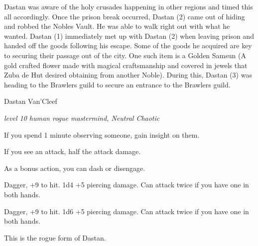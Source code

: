 Dastan was aware of the holy crusades happening in other regions and timed this all accordingly. Once the prison break occurred, Dastan (2) came out of hiding and robbed the Nobles Vault. He was able to walk right out with what he wanted. Dastan (1) immediately met up with Dastan (2) when leaving prison and handed off the goods following his escape. Some of the goods he acquired are key to securing their passage out of the city. One such item is a Golden Samsun (A gold crafted flower made with magical craftsmanship and covered in jewels that Zuba de Hut desired obtaining from another Noble). During this, Dastan (3) was heading to the Brawlers guild to secure an entrance to the Brawlers guild.

\begin{monsterbox}{Dastan Van'Cleef}
	\begin{hangingpar}
		\textit{level 10 human rogue mastermind, Neutral Chaotic}
	\end{hangingpar}
	\dndline%
	\basics[%
	armorclass = 18,
	hitpoints  = 81,
	speed      = 30 ft
	]
	\dndline%
	\stats[
	STR = \stat{8}, %
	DEX = \stat{20},
	CON = \stat{16},
	INT = \stat{12},
	WIS = \stat{11},
	CHA = \stat{17}
	]
	\dndline%
	\details[%
	languages = {Common, Elvish, Dwarvish, Gnomish, Halfling, Celestial, Draconic, Primordial},
	challenge = 10
	]
	\dndline%
	\begin{monsteraction}
		If you spend 1 minute observing someone, gain insight on them.
	\end{monsteraction}	
	\begin{monsteraction}
		If you see an attack, half the attack damage.
	\end{monsteraction}
	\begin{monsteraction}
		As a bonus action, you can dash or disengage.
	\end{monsteraction}
	\begin{monsteraction}
		Dagger, +9 to hit. 1d4 +5 piercing damage. Can attack twice if you have one in both hands.
	\end{monsteraction}
	\begin{monsteraction}
		Dagger, +9 to hit. 1d6 +5 piercing damage. Can attack twice if you have one in both hands.
	\end{monsteraction}
	This is the rogue form of Dastan.
\end{monsterbox}

